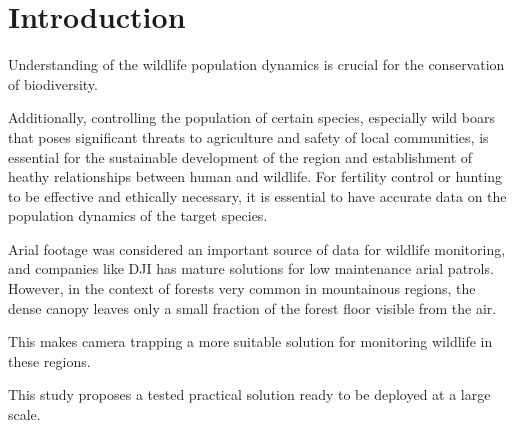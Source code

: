 \section{Introduction}

Understanding of the wildlife population dynamics is crucial for the conservation of biodiversity. 

Additionally, controlling the population of certain species, especially wild boars that poses significant threats to agriculture and safety of local communities\cite{croftTooManyWild2020,quiros-fernandezHuntersServingEcosystem2017}, is essential for the sustainable development of the region and establishment of heathy relationships between human and wildlife\cite{masseiFertilityControlMitigate2014}. For fertility control or hunting to be effective and ethically necessary, it is essential to have accurate data on the population dynamics of the target species.

Arial footage was considered an important source of data for wildlife monitoring, and companies like DJI has mature solutions for low maintenance arial patrols. However, in the context of forests very common in mountainous regions, the dense canopy leaves only a small fraction of the forest floor visible from the air. 

This makes camera trapping a more suitable solution for monitoring wildlife in these regions. 

This study proposes a tested practical solution ready to be deployed at a large scale.

